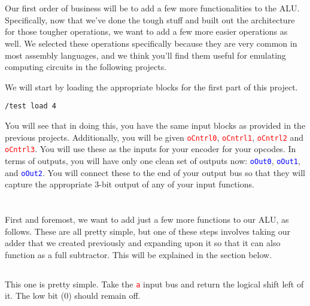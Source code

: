 \documentclass{article}
\newcommand{\varin}[1]{\textcolor{red}{\texttt{#1}}}
\newcommand{\varout}[1]{\textcolor{blue}{\texttt{#1}}}
\begin{document}
\section{\selectfont{Setup}}

Our first order of business will be to add a few more functionalities to the ALU. Specifically, now that we've done the tough stuff and built out the architecture for those tougher operations, we want to add a few more easier operations as well.
We selected these operations specifically because they are very common in most assembly languages, and we think you'll find them useful for emulating computing circuits in the following projects. 

We will start by loading the appropriate blocks for the first part of this project.  

\begin{tcolorbox}
  \texttt{/test load 4}
\end{tcolorbox}

You will see that in doing this, you have the same input blocks as provided in the previous projects.
Additionally, you will be given \varin{oCntrl0}, \varin{oCntrl1}, \varin{oCntrl2} and \varin{oCntrl3}.
You will use these as the inputs for your encoder for your opcodes. 
In terms of outputs, you will have only one clean set of outputs now: \varout{oOut0}, \varout{oOut1}, and \varout{oOut2}.
You will connect these to the end of your output bus so that they will capture the appropriate 3-bit output of any of your input functions.

\section{\selectfont{Adding a Few More Functions}}

First and foremost, we want to add just a few more functions to our ALU, as follows. These are all pretty simple, but one of these steps involves taking our adder that we created previously and expanding upon it so that it can also function as a full subtractor. This will be explained in the section below.

\subsection{\selectfont{Bitshift Left}}

This one is pretty simple. Take the \varin{a} input bus and return the logical shift left of it. The low bit (0) should remain off.
\end{document}
